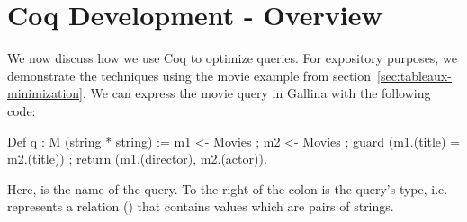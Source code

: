 \documentclass[preprint]{sigplanconf}
\newcommand{\FOR}{{\tt for} \ }
\newcommand{\WHERE}{{\tt where} \ }
\newcommand{\IN}{ \ {\tt in} \ }
\newcommand{\RETURN}{{\tt return} \ }
\begin{document}
%
%

\section{Coq Development - Overview}

We now discuss how we use Coq to optimize queries.
For expository purposes, we demonstrate the techniques using the movie example from section~\ref{sec:tableaux-minimization}.
We can express the movie query in Gallina with the following code:
\begin{coq}
Def q : M (string * string) :=
  m1 <- Movies ; m2 <- Movies ;
  guard (m1.(title) = m2.(title)) ;
  return (m1.(director), m2.(actor)).
\end{coq}
Here,  is the name of the query.
To the right of the colon is the query's type, i.e.  represents a relation () that contains values which are pairs of strings.
\end{document}
